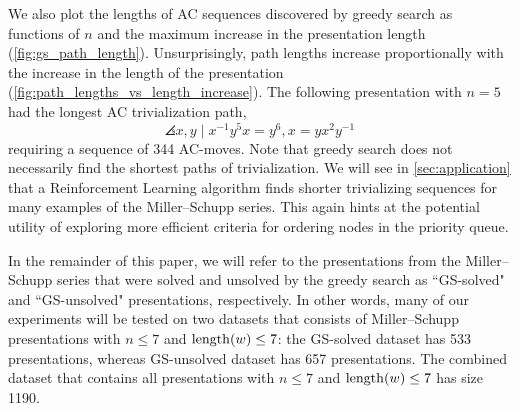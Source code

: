 We also plot the lengths of AC sequences discovered by greedy search as functions of $n$ and the maximum increase in the presentation length (\cref{fig:gs_path_length}).
Unsurprisingly, path lengths increase proportionally with the increase in the length of the presentation (\cref{fig:path_lengths_vs_length_increase}).
The following presentation with $n=5$ had the longest AC trivialization path,
\[
\angles{x, y \mid x^{-1} y^5 x = y^6,  x = y x^2 y^{-1}}
\] %
requiring a sequence of 344 AC-moves.
Note that greedy search does not necessarily find the shortest paths of trivialization.
We will see in \cref{sec:application} that a Reinforcement Learning algorithm finds shorter trivializing sequences for many examples of the Miller--Schupp series.
This again hints at the potential utility of exploring more efficient criteria for ordering nodes in the priority queue.

In the remainder of this paper, we will refer to the presentations from the Miller--Schupp series that were solved and unsolved by the greedy search as ``GS-solved" and ``GS-unsolved" presentations, respectively. In other words, many of our experiments will be tested on two datasets that consists of Miller--Schupp presentations with $n \leq 7$ and $\operatorname{length}(w) \leq 7$: the GS-solved dataset has 533 presentations, whereas GS-unsolved dataset has 657 presentations. The combined dataset that contains all presentations with $n \leq 7$ and $\operatorname{length}(w) \leq 7$ has size 1190.

